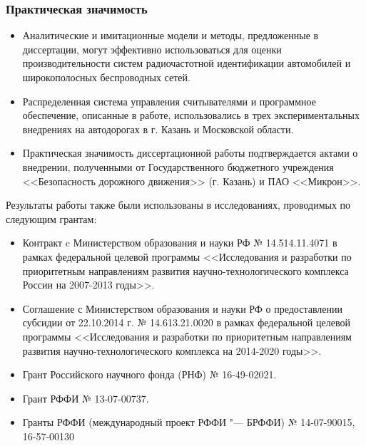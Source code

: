 \begin{frame}[allowframebreaks]
    \frametitle{Практическая значимость}
    \small
    \begin{itemize}
        \item Аналитические и имитационные модели и методы, предложенные в диссертации, могут эффективно использоваться для оценки производительности систем радиочастотной идентификации автомобилей и широкополосных беспроводных сетей.
        \item Распределенная система управления считывателями и программное обеспечение, описанные в работе, использовались в трех экспериментальных внедрениях на автодорогах в г. Казань и Московской области.
        \item Практическая значимость диссертационной работы подтверждается актами о внедрении, полученными от Государственного бюджетного учреждения <<Безопасность дорожного движения>> (г. Казань) и ПАО <<Микрон>>.
    \end{itemize}
    \framebreak
    Результаты работы также были использованы в исследованиях, проводимых по следующим грантам:
    \footnotesize
    \begin{itemize}
        \item Контракт c Министерством образования и науки РФ № 14.514.11.4071 в рамках федеральной целевой программы <<Исследования и разработки по приоритетным направлениям развития научно-технологического комплекса России на 2007-2013 годы>>.
        \item Соглашение с Министерством образования и науки РФ о предоставлении субсидии от 22.10.2014 г. № 14.613.21.0020 в рамках федеральной целевой программы <<Исследования и разработки по приоритетным направлениям развития научно-технологического комплекса на 2014-2020 годы>>.
        \item Грант Российского научного фонда (РНФ) № 16-49-02021.
        \item Грант РФФИ № 13-07-00737.
        \item Гранты РФФИ (международный проект РФФИ "--- БРФФИ) № 14-07-90015, 16-57-00130
    \end{itemize}
\end{frame}


